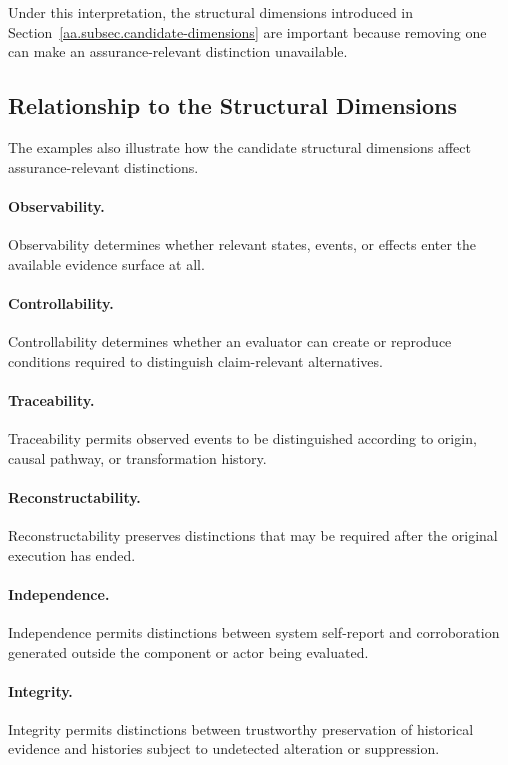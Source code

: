 Under this interpretation, the structural dimensions introduced in
Section~\ref{aa.subsec.candidate-dimensions} are important because
removing one can make an assurance-relevant distinction unavailable.

\subsection{Relationship to the Structural Dimensions}
\label{aa.subsec.cases-dimensions}

The examples also illustrate how the candidate structural dimensions
affect assurance-relevant distinctions.

\paragraph{Observability.}
Observability determines whether relevant states, events, or effects
enter the available evidence surface at all.

\paragraph{Controllability.}
Controllability determines whether an evaluator can create or reproduce
conditions required to distinguish claim-relevant alternatives.

\paragraph{Traceability.}
Traceability permits observed events to be distinguished according
to origin, causal pathway, or transformation history.

\paragraph{Reconstructability.}
Reconstructability preserves distinctions that may be required after
the original execution has ended.

\paragraph{Independence.}
Independence permits distinctions between system self-report and
corroboration generated outside the component or actor being evaluated.

\paragraph{Integrity.}
Integrity permits distinctions between trustworthy preservation of
historical evidence and histories subject to undetected alteration
or suppression.

